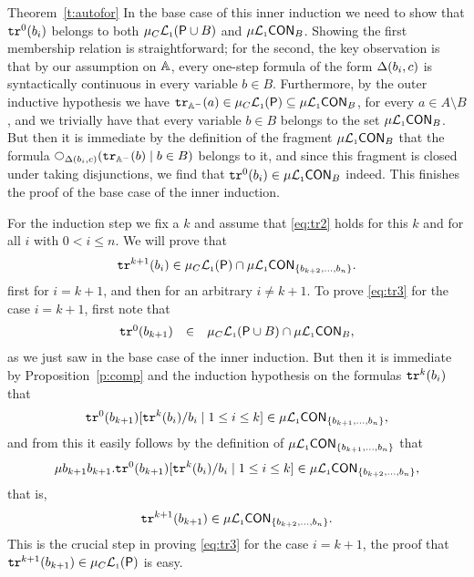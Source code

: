 \begin{proofof}{Theorem~\ref{t:autofor}}
In the base case of this inner induction we need to show that $\mathtt{tr}^{0}(b_{i})$ 
belongs to both $\mu_{C}\mathcal{L}_{\scriptscriptstyle 1}(\mathsf{P} \cup B)$ and $\mu\mathcal{L}_{\scriptscriptstyle 1}\mathsf{CON}_{B}$.
Showing the first membership relation is straightforward; for the second, the 
key observation is that by our assumption on $\mathbb{A}$, every one-step formula of
the form $\Delta(b_{i},c)$ is syntactically continuous in every variable $b \in 
B$.
Furthermore, by the outer inductive hypothesis we have $\mathtt{tr}_{\mathbb{A}^{-}}(a) \in
\mu_{C}\mathcal{L}_{\scriptscriptstyle 1}(\mathsf{P}) \subseteq \mu\mathcal{L}_{\scriptscriptstyle 1}\mathsf{CON}_{B}$,
for every $a \in A \setminus B$, and we trivially have that every variable $b 
\in B$ belongs to the set $\mu\mathcal{L}_{\scriptscriptstyle 1}\mathsf{CON}_{B}$.
But then it is immediate by the definition of the fragment $\mu\mathcal{L}_{\scriptscriptstyle 1}\mathsf{CON}_{B}$
that  the formula $\nxt{\tmap(b_{i},c)}(\ytr_{\bbA^{-}}(b)\mid b \in B)$ belongs
to it, and since this fragment is closed under taking disjunctions, we find that 
$\mathtt{tr}^{0}(b_{i}) \in \mu\mathcal{L}_{\scriptscriptstyle 1}\mathsf{CON}_{B}$ indeed.
This finishes the proof of the base case of the inner induction.

For the induction step we fix a $k$ and assume that
\eqref{eq:tr2} holds for this $k$ and for all $i$ with $0 < i \leq n$.
We will prove that
\begin{equation}
\label{eq:tr3}
\ytr^{k+1}(b_{i}) \in \mu_{C}\llang(\props) \cap 
    \cont{\mu\llang}{\{ b_{k+2},\ldots,b_{n}\}}.
\end{equation}
first for $i = k+1$, and then for an arbitrary $i \neq k+1$.
To prove \eqref{eq:tr3} for the case $i = k+1$, first note that
\[\begin{array}{lcl}
\mathtt{tr}^{0}(b_{k+1}) &\in& \mu_{C}\mathcal{L}_{\scriptscriptstyle 1}(\mathsf{P}\cup B) 
   \cap \mu\mathcal{L}_{\scriptscriptstyle 1}\mathsf{CON}_{B},
\end{array}\]
as we just saw in the base case of the inner induction.
But then it is immediate by Proposition~\ref{p:comp} and the induction 
hypothesis on the formulas $\mathtt{tr}^{k}(b_{i})$ that 
\[
\mathtt{tr}^{0}(b_{k+1})[\mathtt{tr}^{k}(b_{i})/b_{i} \mid 1 \leq i\leq k]
\in \mu\mathcal{L}_{\scriptscriptstyle 1}\mathsf{CON}_{\{ b_{k+1},\ldots,b_{n}\}},
\]
and from this it easily follows by the definition of 
$\mu\mathcal{L}_{\scriptscriptstyle 1}\mathsf{CON}_{\{ b_{k+1},\ldots,b_{n}\}}$ that 
\[
\mu b_{k+1} b_{k+1}. \mathtt{tr}^{0}(b_{k+1})[\mathtt{tr}^{k}(b_{i})/b_{i} \mid 1 \leq i\leq k]
\in \mu\mathcal{L}_{\scriptscriptstyle 1}\mathsf{CON}_{\{ b_{k+2},\ldots,b_{n}\}},
\]
that is, 
\[
\mathtt{tr}^{k+1}(b_{k+1}) \in \mu\mathcal{L}_{\scriptscriptstyle 1}\mathsf{CON}_{\{ b_{k+2},\ldots,b_{n}\}}.
\]
This is the crucial step in proving \eqref{eq:tr3} for the case $i=k+1$,
the proof that $\mathtt{tr}^{k+1}(b_{k+1}) \in \mu_{C}\mathcal{L}_{\scriptscriptstyle 1}(\mathsf{P})$ is easy.


\end{proofof}
